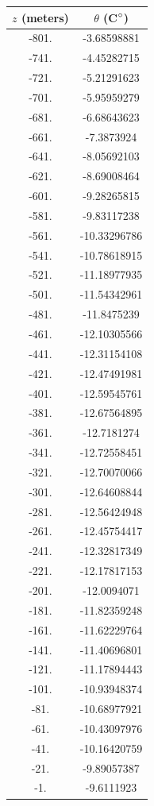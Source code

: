 \documentclass{article}%
\begin{document}
    \begin{table}[h!]
        \centering
        \begin{tabular}{c|c}
            $z$ (meters) & $\theta$ (C$\degree$)\\
            \hline
            -801. & -3.68598881\\  
            -741. & -4.45282715\\
            -721. & -5.21291623\\
            -701. & -5.95959279\\
            -681. & -6.68643623\\
            -661. & -7.3873924 \\
            -641. & -8.05692103\\
            -621. & -8.69008464\\
            -601. & -9.28265815\\
            -581. & -9.83117238\\
            -561. & -10.33296786\\ 
            -541. & -10.78618915\\
            -521. & -11.18977935\\
            -501. & -11.54342961\\
            -481. & -11.8475239 \\
            -461. & -12.10305566\\
            -441. & -12.31154108\\
            -421. & -12.47491981\\
            -401. & -12.59545761\\
            -381. & -12.67564895\\
            -361. & -12.7181274 \\
            -341. & -12.72558451\\
            -321. & -12.70070066\\
            -301. & -12.64608844\\
            -281. & -12.56424948\\
            -261. & -12.45754417\\
            -241. & -12.32817349\\
            -221. & -12.17817153\\
            -201. & -12.0094071 \\
            -181. & -11.82359248\\
            -161. & -11.62229764\\
            -141. & -11.40696801\\
            -121. & -11.17894443\\
            -101. & -10.93948374\\
             -81. & -10.68977921\\
             -61. & -10.43097976\\
             -41. & -10.16420759\\
             -21. & -9.89057387 \\
              -1. & -9.6111923  \\   


\end{tabular}
\end{table}
\end{document}
